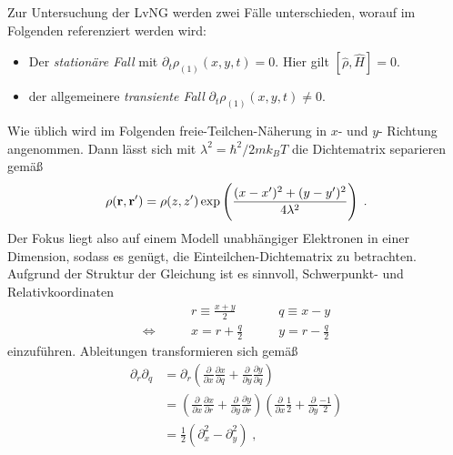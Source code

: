 Zur Untersuchung der LvNG werden zwei Fälle unterschieden, worauf im Folgenden referenziert werden wird:
\begin{itemize}
  \item Der \emph{stationäre Fall} mit $\partial_t \rho_{(1)}(x,y,t) = 0$. Hier gilt ${\left[\hat{\rho} , \hat{H}\right]=0}$.
  \item der allgemeinere \emph{transiente Fall} $\partial_t \rho_{(1)}(x,y,t) \neq 0$.
\end{itemize}
Wie üblich wird im Folgenden freie-Teilchen-Näherung in $x$- und $y$- Richtung angenommen. Dann lässt sich mit $\lambda^2 = \hbar^2/2mk_B T$ die Dichtematrix separieren \cite{grubin1993transport} gemäß
\begin{equation}
  \rho(\vb{r},\vb{r}') = \rho({z},{z}') \exp\left( \frac{(x-x')^2 + (y-y')^2}{4\lambda^2}\right) \; .
\end{equation}
Der Fokus liegt also auf einem Modell unabhängiger Elektronen in einer Dimension, sodass es genügt, die Einteilchen-Dichtematrix zu betrachten.
Aufgrund der Struktur der Gleichung ist es sinnvoll, Schwerpunkt- und Relativkoordinaten
\begin{equation}
  \begin{aligned}
    &r \equiv \frac{x+y}{2} \qquad &q \equiv x-y \\
    \Leftrightarrow\qquad &x = r+\frac{q}{2} \qquad &y = r-\frac{q}{2}
  \end{aligned}
  \label{eq:gedrehteKoordinaten}
\end{equation}
einzuführen. 
Ableitungen transformieren sich gemäß
\begin{equation*}
  \begin{aligned}
    \partial_r \partial_q  &= \partial_r \left( \frac{\partial}{\partial x} \frac{\partial x}{\partial q} + \frac{\partial}{\partial y} \frac{\partial y}{\partial q}\right) \\
     &= \left( \frac{\partial}{\partial x} \frac{\partial x}{\partial r} + \frac{\partial}{\partial y} \frac{\partial y}{\partial r}\right) \left( \frac{\partial}{\partial x} \frac{1}{2} + \frac{\partial}{\partial y} \frac{-1}{2}\right)\\
    &=  \frac{1}{2}(\partial_x^2 - \partial_y^2) \; ,
  \end{aligned}
\end{equation*}
